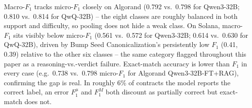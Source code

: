 \documentclass[lettersize,journal]{IEEEtran}
\begin{document}
\begin{table}[t]
\centering
\small
\caption{Solana, per-class precision/recall/F1, headline FT+RAG configurations. Macro-$F_1$ and exact-match accuracy (bottom rows) summarize across all 7 classes.}
\label{tab:percategory_formal_solana}
\end{table}

Macro-$F_1$ tracks micro-$F_1$ closely on Algorand (0.792 vs.\ 0.798 for Qwen3-32B; 0.810 vs.\ 0.814
for QwQ-32B) -- the eight classes are roughly balanced in both support and difficulty, so pooling
does not hide a weak class. On Solana, macro-$F_1$ sits visibly below micro-$F_1$ (0.561 vs.\ 0.572
for Qwen3-32B; 0.614 vs.\ 0.630 for QwQ-32B), driven by Bump Seed Canonicalization's persistently
low $F_1$ (0.41, 0.39) relative to the other six classes -- the same category flagged throughout
this paper as a reasoning-vs.-verdict failure. Exact-match
accuracy is lower than $F_1$ in every case (e.g.\ 0.738 vs.\ 0.798 micro-$F_1$ for
Algorand Qwen3-32B-FT+RAG), confirming the gap is real. In roughly 6\% of contracts the model
reports the correct label, an error $F_1^{\mu}$ and $F_1^{M}$
both discount as partially correct but exact-match does not.
\end{document}
